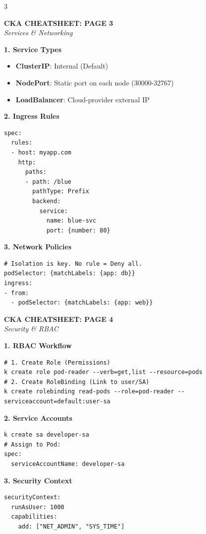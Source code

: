 \documentclass[10pt,landscape]{article}
\newcommand{\sectionheader}[1]{%
    \vspace{2pt}\noindent\colorbox{blue!15}{\parbox{\dimexpr\linewidth-2\fboxsep}{%
    \textbf{#1}}}\vspace{2pt}%
}
\begin{document}
\begin{multicols*}{3}
\columnbreak

\begin{center}\textbf{\Large CKA CHEATSHEET: PAGE 3}\\\textit{Services \& Networking}\end{center}

\sectionheader{1. Service Types}
\begin{itemize}
    \item \textbf{ClusterIP}: Internal (Default)
    \item \textbf{NodePort}: Static port on each node (30000-32767)
    \item \textbf{LoadBalancer}: Cloud-provider external IP
\end{itemize}

\sectionheader{2. Ingress Rules}
\begin{lstlisting}
spec:
  rules:
  - host: myapp.com
    http:
      paths:
      - path: /blue
        pathType: Prefix
        backend:
          service:
            name: blue-svc
            port: {number: 80}
\end{lstlisting}

\sectionheader{3. Network Policies}
\begin{lstlisting}
# Isolation is key. No rule = Deny all.
podSelector: {matchLabels: {app: db}}
ingress:
- from:
  - podSelector: {matchLabels: {app: web}}
\end{lstlisting}

\newpage
\begin{center}\textbf{\Large CKA CHEATSHEET: PAGE 4}\\\textit{Security \& RBAC}\end{center}

\sectionheader{1. RBAC Workflow}
\begin{lstlisting}
# 1. Create Role (Permissions)
k create role pod-reader --verb=get,list --resource=pods
# 2. Create RoleBinding (Link to user/SA)
k create rolebinding read-pods --role=pod-reader --serviceaccount=default:user-sa
\end{lstlisting}

\sectionheader{2. Service Accounts}
\begin{lstlisting}
k create sa developer-sa
# Assign to Pod:
spec:
  serviceAccountName: developer-sa
\end{lstlisting}

\sectionheader{3. Security Context}
\begin{lstlisting}
securityContext:
  runAsUser: 1000
  capabilities:
    add: ["NET_ADMIN", "SYS_TIME"]
\end{lstlisting}


\end{multicols*}
\end{document}
